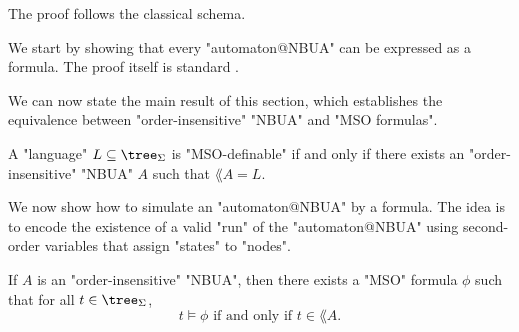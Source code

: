 \documentclass[a4paper,UKenglish,cleveref, autoref, thm-restate]{lipics-v2021}
\begin{document}
The proof follows the classical schema.

We start by showing that every "automaton@NBUA" can be expressed as a formula. The proof itself is standard \cite{Buchi60, Thomas1997, bookautomata}.

We can now state the main result of this section, which establishes the equivalence between "order-insensitive" "NBUA" and "MSO formulas".

\begin{theorem}\label{thm:MSO-NBUA}
	A "language" $L \subseteq \tree_{\Sigma}$ is "MSO-definable" if and only if there exists an "order-insensitive" "NBUA" $A$ such that $\lang A = L$.
\end{theorem}


We now show how to simulate an "automaton@NBUA" by a formula. The idea is to encode the existence of a valid "run" of
the "automaton@NBUA" using second-order variables that assign "states" to "nodes".

\begin{lemma}
	If $A$ is an "order-insensitive" "NBUA", then there exists a "MSO" formula $\phi$ such that for all $t \in \tree_{\Sigma}$,
	\[
		t \models \phi \text{ if and only if } t \in \lang A.
	\]
\end{lemma}
\end{document}
